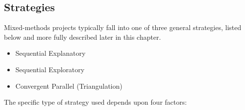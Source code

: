 
\subsection{Strategies}

Mixed-methods projects typically fall into one of three general strategies, listed below and more fully described later in this chapter.

\begin{itemize}

	\item Sequential Explanatory

	\item Sequential Exploratory

	\item Convergent Parallel (Triangulation)

\end{itemize}

The specific type of strategy used depends upon four factors:

